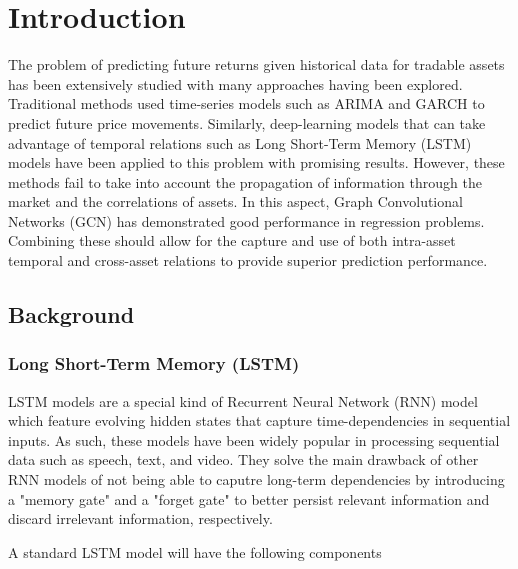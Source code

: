 \section{Introduction} \label{Introduction}

The problem of predicting future returns given historical data for tradable assets has been extensively studied 
with many approaches having been explored. Traditional methods used time-series models such as ARIMA and GARCH to predict future price movements. Similarly, deep-learning models that can take advantage of temporal relations such as Long Short-Term Memory (LSTM) models have been applied to this problem with promising results. 
However, these methods fail to take into account the propagation of information through the market and the correlations of assets. In this aspect, Graph Convolutional Networks (GCN) has demonstrated good performance in regression problems. Combining these should allow for the capture and use of both intra-asset temporal and cross-asset relations to provide superior prediction performance.

\subsection{Background} \label{Background}

\subsubsection{Long Short-Term Memory (LSTM)} \label{LSTM}


LSTM models are a special kind of Recurrent Neural Network (RNN) model which feature evolving hidden states that capture time-dependencies in sequential inputs. As such, these models have been widely popular in processing sequential data such as speech, text, and video. They solve the main drawback of other RNN models of not being able to caputre long-term dependencies by introducing a "memory gate" and a "forget gate" to better persist relevant information and discard irrelevant information, respectively. 

A standard LSTM model will have the following components

